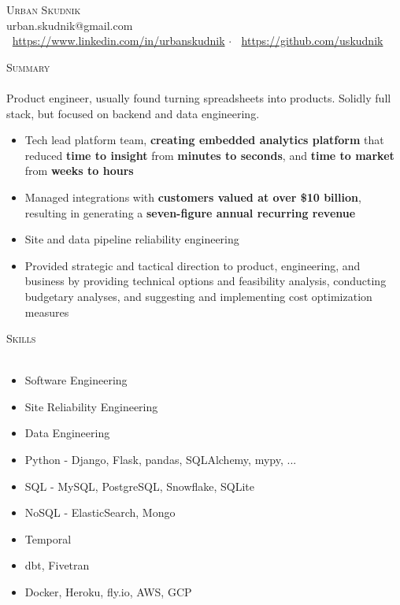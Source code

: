 \documentclass[a4paper]{article}
\newcommand{\lineunder} {
    \vspace*{-8pt} \\
    \hspace*{-18pt} {\color{Mahogany} \hrulefill} \\
}
\newcommand{\header} [1] {
    \vspace{4mm}
    {\hspace*{-18pt}\vspace*{6pt} \large \textsc{\textcolor{Mahogany}{#1}}}
    \vspace*{-6pt} \lineunder
}
\begin{document}
\vspace*{-40pt}



\vspace*{-10pt}
\begin{center}
	{\Huge \scshape {Urban Skudnik}}\\
    \vspace{2mm}
	urban.skudnik@gmail.com\\
    \vspace{2mm}
    \faLinkedinSquare  $\>$ \url{https://www.linkedin.com/in/urbanskudnik} $\cdot$
    \faGithub $\>$ \url{https://github.com/uskudnik}\\
\end{center}

\header{Summary}
Product engineer, usually found turning spreadsheets into products. Solidly full stack, but focused on backend and data engineering.

\begin{itemize} \itemsep 1pt
\item Tech lead platform team, \textbf{creating embedded analytics platform} that reduced \textbf{time to insight} from \textbf{minutes to seconds}, and \textbf{time to market} from \textbf{weeks to hours}
\item Managed integrations with \textbf{customers valued at over \$10 billion}, resulting in generating a \textbf{seven-figure annual recurring revenue}
\item Site and data pipeline reliability engineering
\item Provided strategic and tactical direction to product, engineering, and business by providing technical options and feasibility analysis, conducting budgetary analyses, and suggesting and implementing cost optimization measures
\end{itemize}


\header{Skills}
\begin{itemize} \itemsep 1pt
    \item Software Engineering
    \item Site Reliability Engineering
    \item Data Engineering
    \item Python - Django, Flask, pandas, SQLAlchemy, mypy, ...
    \item SQL - MySQL, PostgreSQL, Snowflake, SQLite
    \item NoSQL - ElasticSearch, Mongo
    \item Temporal
    \item dbt, Fivetran
    \item Docker, Heroku, fly.io, AWS, GCP
\end{itemize}
\end{document}
